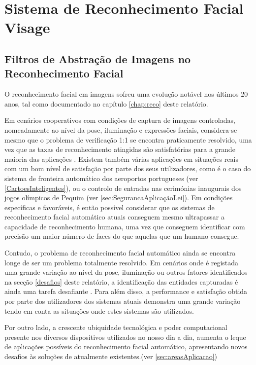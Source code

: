 \chapter{Sistema de Reconhecimento Facial Visage} \label{chap:visage}

\section{Filtros de Abstração de Imagens no Reconhecimento Facial}
O reconhecimento facial em imagens sofreu uma evolução notável nos últimos 20 anos, tal como documentado no capítulo \ref{chap:reco} deste relatório. 

Em cenários cooperativos com condições de captura de imagens controladas, nomeadamente ao nível da pose, iluminação e expressões faciais, considera-se mesmo que o problema de verificação 1:1 se encontra praticamente resolvido, uma vez que as taxas de reconhecimento atingidas são satisfatórias para a grande maioria das aplicações \cite{Li2011}. Existem também várias aplicações em situações reais com um bom nível de satisfação por parte dos seus utilizadores, como é o caso do sistema de fronteira automático dos aeroportos portugueses (ver \ref{CartoesInteligentes}), ou o controlo de entradas nas cerimónias inaugurais dos jogos olímpicos de Pequim (ver \ref{sec:SegurancaAplicaçãoLei}). Em condições específicas e favoráveis, é então possível considerar que os sistemas de reconhecimento facial automático atuais conseguem mesmo ultrapassar a capacidade de reconhecimento humana, uma vez que conseguem identificar com precisão um maior número de faces do que aquelas que um humano consegue.

Contudo, o problema de reconhecimento facial automático ainda se encontra longe de ser um problema totalmente resolvido. Em cenários onde é registada uma grande variação ao nível da pose, iluminação ou outros fatores identificados na secção \ref{desafios} deste relatório, a identificação das entidades capturadas é ainda uma tarefa desafiante  \cite{Li2011}. Para além disso, a performance e satisfação obtida por parte dos utilizadores dos sistemas atuais demonstra uma grande variação tendo em conta as situações onde estes sistemas são utilizados. 

Por outro lado, a crescente ubiquidade tecnológica e poder computacional presente nos diversos dispositivos utilizados no nosso dia a dia, aumenta o leque de aplicações possíveis do reconhecimento facial automático, apresentando novos desafios às soluções de atualmente existentes.(ver \ref{sec:areasAplicacao})

